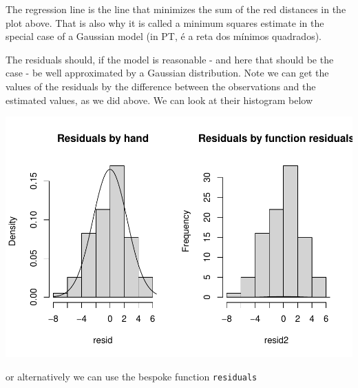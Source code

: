 \documentclass[
]{book}
\newenvironment{Shaded}{\begin{snugshade}}{\end{snugshade}}
\newcommand{\CommentTok}[1]{\textcolor[rgb]{0.56,0.35,0.01}{\textit{#1}}}
\newcommand{\DataTypeTok}[1]{\textcolor[rgb]{0.13,0.29,0.53}{#1}}
\newcommand{\DecValTok}[1]{\textcolor[rgb]{0.00,0.00,0.81}{#1}}
\newcommand{\FloatTok}[1]{\textcolor[rgb]{0.00,0.00,0.81}{#1}}
\newcommand{\KeywordTok}[1]{\textcolor[rgb]{0.13,0.29,0.53}{\textbf{#1}}}
\newcommand{\NormalTok}[1]{#1}
\newcommand{\OperatorTok}[1]{\textcolor[rgb]{0.81,0.36,0.00}{\textbf{#1}}}
\newcommand{\OtherTok}[1]{\textcolor[rgb]{0.56,0.35,0.01}{#1}}
\newcommand{\StringTok}[1]{\textcolor[rgb]{0.31,0.60,0.02}{#1}}
\begin{document}
The regression line is the line that minimizes the sum of the red distances in the plot above. That is also why it is called a minimum squares estimate in the special case of a Gaussian model (in PT, é a reta dos mínimos quadrados).

The residuals should, if the model is reasonable - and here that should be the case - be well approximated by a Gaussian distribution. Note we can get the values of the residuals by the difference between the observations and the estimated values, as we did above. We can look at their histogram below

\begin{Shaded}
\end{Shaded}

\includegraphics{ECOMODbook_files/figure-latex/a6.12-1.pdf}

or alternatively we can use the bespoke function \texttt{residuals}
\end{document}
